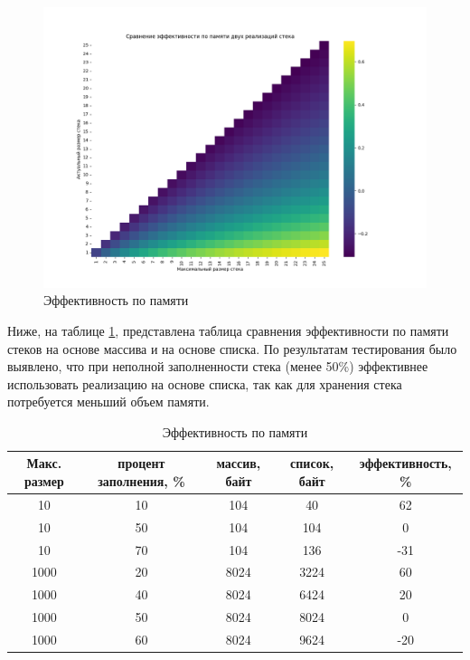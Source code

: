 \begin{figure}[h]
	\centering
	\includegraphics[width=\linewidth]{img/memgraph.png}
	\caption{Эффективность по памяти}
	\label{graph:mem}
\end{figure}

\clearpage

Ниже, на таблице \ref{table:mem}, представлена таблица сравнения эффективности по памяти стеков на основе массива и на основе списка. По результатам тестирования было выявлено, что при неполной заполненности стека (менее 50\%) эффективнее использовать реализацию на основе списка, так как для хранения стека потребуется меньший объем памяти.

\begin{table}
	\caption{Эффективность по памяти}
	\begin{center}
		\begin{tabular}{|c|c|c|c|c|}
			\hline
			Макс. размер & процент заполнения, \% & массив, байт & список, байт & эффективность, \% \\
			\hline
			10 & 10 & 104 & 40 & 62 \\
			10 & 50 & 104 & 104 & 0 \\
			10 & 70 & 104 & 136 & -31 \\
			1000 & 20 & 8024 & 3224 & 60 \\
			1000 & 40 & 8024 & 6424 & 20 \\
			1000 & 50 & 8024 & 8024 & 0 \\
			1000 & 60 & 8024 & 9624 & -20 \\
			\hline
		\end{tabular}
	\end{center}
	\label{table:mem}
\end{table}

